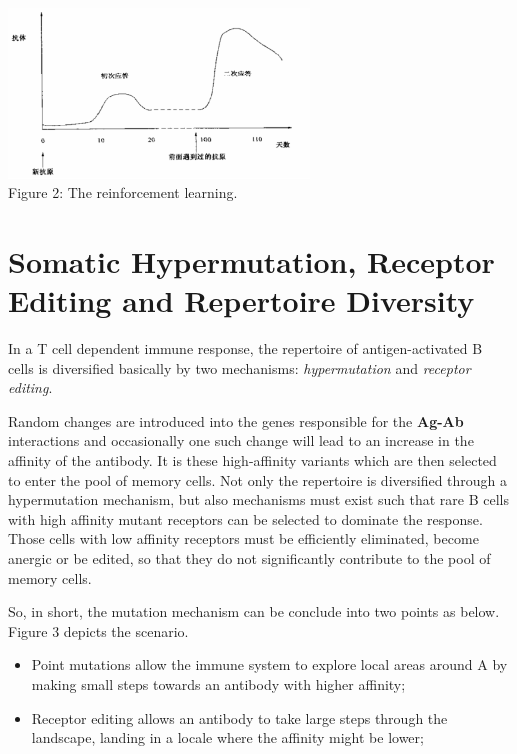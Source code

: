 \documentclass{article}
\begin{document}
\begin{center} 
\includegraphics[width=8cm,clip]{images/cj_reinfor_learn.png}\\
\caption{Figure 2: The reinforcement learning.}	
\end{center} 


\section{Somatic Hypermutation, Receptor Editing and Repertoire Diversity}
In a T cell dependent immune response, the repertoire of antigen-activated B cells is diversified basically by two mechanisms: \textsl{hypermutation} and \textsl{receptor editing}.

Random changes are introduced into the genes responsible for the \textbf{Ag-Ab} interactions and occasionally one such change will lead to an increase in the affinity of the antibody. It is these high-affinity variants which are then selected to enter the pool of memory cells. Not only the repertoire is diversified through a hypermutation mechanism, but also mechanisms must exist such that rare B cells with high affinity mutant receptors can be selected to dominate the response. Those cells with low affinity receptors must be efficiently eliminated, become anergic or be edited, so that they do not significantly contribute to the pool of memory cells.

So, in short, the mutation mechanism can be conclude into two points as below. Figure 3 depicts the scenario.

\begin{itemize}
\item{Point mutations allow the immune system to explore
local areas around A by making small steps towards an antibody with higher affinity;}

\item{Receptor editing allows an antibody to take large
steps through the landscape, landing in a locale where the affinity might be lower;}
\end{itemize}
\end{document}

